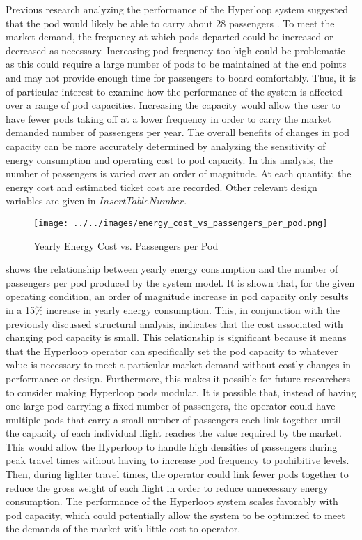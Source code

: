 Previous research analyzing the performance of the Hyperloop system suggested that the pod would likely be able to carry about 28 passengers \cite{Musk}. To meet the market demand, the frequency at which pods departed could be increased or decreased as necessary. Increasing pod frequency too high could be problematic as this could require a large number of pods to be maintained at the end points and may not provide enough time for passengers to board comfortably. Thus, it is of particular interest to examine how the performance of the system is affected over a range of pod capacities. Increasing the capacity would allow the user to have fewer pods taking off at a lower frequency in order to carry the market demanded number of passengers per year. The overall benefits of changes in pod capacity can be more accurately determined by analyzing the sensitivity of energy consumption and operating cost to pod capacity.
In this analysis, the number of passengers is varied over an order of magnitude. At each quantity, the energy cost and estimated ticket cost are recorded. Other relevant design variables are given in $Insert Table Number$.
\begin{figure}
	\centering
	\texttt{[image: ../../images/energy\_cost\_vs\_passengers\_per\_pod.png]}
	\caption{Yearly Energy Cost vs. Passengers per Pod}
	\label{fig:energy_cost_vs_passengers}
\end{figure}
 shows the relationship between yearly energy consumption and the number of passengers per pod produced by the system model. It is shown that, for the given operating condition, an order of magnitude increase in pod capacity only results in a 15\% increase in yearly energy consumption. This, in conjunction with the previously discussed structural analysis, indicates that the cost associated with changing pod capacity is small. This relationship is significant because it means that the Hyperloop operator can specifically set the pod capacity to whatever value is necessary to meet a particular market demand without costly changes in performance or design. Furthermore, this makes it possible for future researchers to consider making Hyperloop pods modular. It is possible that, instead of having one large pod carrying a fixed number of passengers, the operator could have multiple pods that carry a small number of passengers each link together until the capacity of each individual flight reaches the value required by the market. This would allow the Hyperloop to handle high densities of passengers during peak travel times without having to increase pod frequency to prohibitive levels. Then, during lighter travel times, the operator could link fewer pods together to reduce the gross weight of each flight in order to reduce unnecessary energy consumption. The performance of the Hyperloop system scales favorably with pod capacity, which could potentially allow the system to be optimized to meet the demands of the market with little cost to operator.
